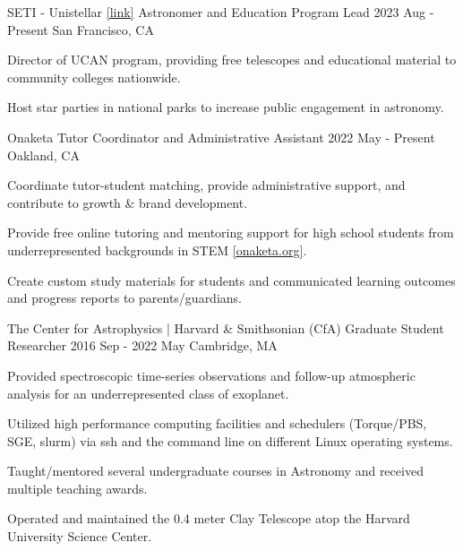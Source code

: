 
\begin{cventries}

  \cventry
    {
    SETI - Unistellar \href{https://www.seti.org/unistellar-college-astronomy-network-ucan}{[link]}
    }
    {Astronomer and Education Program Lead}
    {2023 Aug - Present}
    {San Francisco, CA}
    {
      \begin{cvitems}
        \item Director of UCAN program, providing free telescopes and educational material to community colleges nationwide.
        \item Host star parties in national parks to increase public engagement in astronomy.
      \end{cvitems}
    }

  \cventry
    {Onaketa} %
    {Tutor Coordinator and Administrative Assistant} %
    {2022 May - Present} %
    {Oakland, CA} %
    {
      \begin{cvitems} %
        \item Coordinate tutor-student matching, provide administrative support, and contribute to growth \& brand development.
        \item Provide free online tutoring and mentoring support for high school students from underrepresented backgrounds in STEM \href{https://www.onaketa.org/about}{[onaketa.org]}.
        \item Create custom study materials for students and communicated learning outcomes and progress reports to parents/guardians.
      \end{cvitems}
    }
  
  \cventry
    {The Center for Astrophysics | Harvard \& Smithsonian (CfA)} %
    {Graduate Student Researcher} %
    {2016 Sep - 2022 May} %
    {Cambridge, MA} %
    {
      \begin{cvitems} %
        \item Provided spectroscopic time-series observations and follow-up atmospheric analysis for an underrepresented class of exoplanet.
        \item Utilized high performance computing facilities and schedulers (Torque/PBS, SGE, slurm) via ssh and the command line on different Linux operating systems.
        \item Taught/mentored several undergraduate courses in Astronomy and received multiple teaching awards.
        \item Operated and maintained the 0.4 meter Clay Telescope atop the Harvard University Science Center.
      \end{cvitems}
    }
    

\end{cventries}
